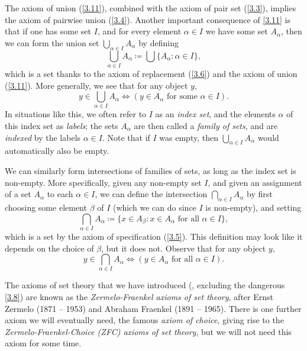 \begin{note}
  The axiom of union (\cref{3.11}), combined with the axiom of pair set (\cref{3.3}), implies the axiom of pairwise union (\cref{3.4}).
  Another important consequence of \cref{3.11} is that if one has some set \(I\), and for every element \(\alpha \in I\) we have some set \(A_{\alpha}\), then we can form the union set \(\bigcup_{\alpha \in I} A_{\alpha}\) by defining
  \[
    \bigcup_{\alpha \in I} A_{\alpha} \coloneqq \bigcup \{A_{\alpha} : \alpha \in I\},
  \]
  which is a set thanks to the axiom of replacement (\cref{3.6}) and the axiom of union (\cref{3.11}).
  More generally, we see that for any object \(y\),
  \[
    y \in \bigcup_{\alpha \in I} A_{\alpha} \iff (y \in A_{\alpha} \text{ for some } \alpha \in I).
  \]
  In situations like this, we often refer to \(I\) as an \emph{index set}, and the elements \(\alpha\) of this index set as \emph{labels};
  the sets \(A_{\alpha}\) are then called a \emph{family of sets}, and are \emph{indexed} by the labels \(\alpha \in I\).
  Note that if \(I\) was empty, then \(\bigcup_{\alpha \in I} A_{\alpha}\) would automatically also be empty.
\end{note}

\begin{note}
  We can similarly form intersections of families of sets, as long as the index set is non-empty.
  More specifically, given any non-empty set \(I\), and given an assignment of a set \(A_{\alpha}\) to each \(\alpha \in I\), we can define the intersection \(\bigcap_{\alpha \in I} A_{\alpha}\) by first choosing some element \(\beta\) of \(I\) (which we can do since \(I\) is non-empty), and setting
  \[
    \bigcap_{\alpha \in I} A_{\alpha} \coloneqq \{x \in A_{\beta} : x \in A_{\alpha} \text{ for all } \alpha \in I\},
  \]
  which is a set by the axiom of specification (\cref{3.5}).
  This definition may look like it depends on the choice of \(\beta\), but it does not.
  Observe that for any object \(y\),
  \[
    y \in \bigcap_{\alpha \in I} A_{\alpha} \iff (y \in A_{\alpha} \text{ for all } \alpha \in I).
  \]
\end{note}

\setcounter{thm}{11}
\begin{rmk}\label{3.4.12}
  The axioms of set theory that we have introduced (, excluding the dangerous \cref{3.8}) are known as the \emph{Zermelo-Fraenkel axioms of set theory}, after Ernst Zermelo (1871 -- 1953) and Abraham Fraenkel (1891 -- 1965).
  There is one further axiom we will eventually need, the famous \emph{axiom of choice}, giving rise to the \emph{Zermelo-Fraenkel-Choice (ZFC) axioms of set theory}, but we will not need this axiom for some time.
\end{rmk}

